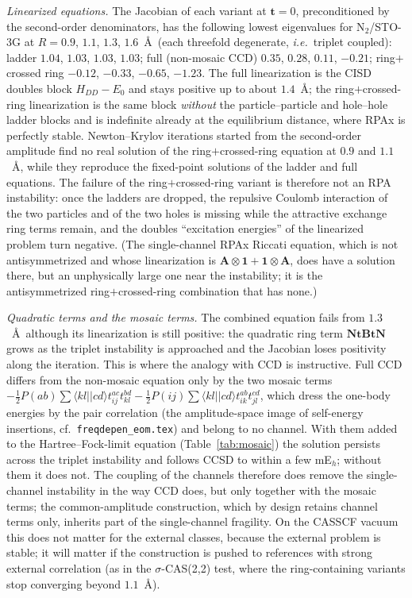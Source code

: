 \documentclass[aip,jcp,reprint,noshowkeys,superscriptaddress]{revtex4-1}
\newcommand{\ie}{\textit{i.e.}}
\newcommand{\bI}{\boldsymbol{1}}
\newcommand{\bA}{\boldsymbol{A}}
\newcommand{\bB}{\boldsymbol{B}}
\newcommand{\bN}{\boldsymbol{N}}
\newcommand{\bt}{\boldsymbol{t}}
\begin{document}
\emph{Linearized equations.}  The Jacobian of each variant at $\bt=0$,
preconditioned by the second-order denominators, has the following lowest
eigenvalues for N$_2$/STO-3G at $R=0.9$, $1.1$, $1.3$, $1.6$~\AA\ (each
threefold degenerate, \ie\ triplet coupled): ladder $1.04$, $1.03$, $1.03$,
$1.03$; full (non-mosaic CCD) $0.35$, $0.28$, $0.11$, $-0.21$;
ring$+$crossed ring $-0.12$, $-0.33$, $-0.65$, $-1.23$.  The full
linearization is the CISD doubles block $H_{DD}-E_0$ and stays positive up to
about $1.4$~\AA; the ring$+$crossed-ring linearization is the same block
\emph{without} the particle--particle and hole--hole ladder blocks and is
indefinite already at the equilibrium distance, where RPAx is perfectly
stable.  Newton--Krylov iterations started from the second-order amplitude
find no real solution of the ring$+$crossed-ring equation at $0.9$ and
$1.1$~\AA, while they reproduce the fixed-point solutions of the ladder and
full equations.  The failure of the ring$+$crossed-ring variant is therefore
not an RPA instability: once the ladders are dropped, the repulsive
Coulomb interaction of the two particles and of the two holes is missing
while the attractive exchange ring terms remain, and the doubles
``excitation energies'' of the linearized problem turn negative.  (The
single-channel RPAx Riccati equation, which is not antisymmetrized and whose
linearization is $\bA\otimes\bI+\bI\otimes\bA$, does have a solution there,
but an unphysically large one near the instability; it is the
antisymmetrized ring$+$crossed-ring combination that has none.)

\emph{Quadratic terms and the mosaic terms.}  The combined equation fails
from $1.3$~\AA\ although its linearization is still positive: the quadratic
ring term $\bN\bt\bB\bt\bN$ grows as the triplet instability is approached
and the Jacobian loses positivity along the iteration.  This is where the
analogy with CCD is instructive.  Full CCD differs from the non-mosaic
equation only by the two mosaic terms
$-\tfrac12P(ab)\sum\langle kl||cd\rangle t^{ac}_{ij}t^{bd}_{kl}-\tfrac12P(ij)\sum\langle kl||cd\rangle t^{ab}_{ik}t^{cd}_{jl}$,
which dress the one-body energies by the pair correlation (the
amplitude-space image of self-energy insertions, cf.\ \texttt{freqdepen\_eom.tex})
and belong to no channel.  With them added to the Hartree--Fock-limit
equation (Table~\ref{tab:mosaic}) the solution persists across the triplet
instability and follows CCSD to within a few mE$_h$; without them it does
not.  The coupling of the channels therefore does remove the single-channel
instability in the way CCD does, but only together with the mosaic terms;
the common-amplitude construction, which by design retains channel terms
only, inherits part of the single-channel fragility.  On the CASSCF vacuum
this does not matter for the external classes, because the external
problem is stable; it will matter if the construction is pushed to
references with strong external correlation (as in the $\sigma$-CAS(2,2)
test, where the ring-containing variants stop converging beyond $1.1$~\AA).
\end{document}
